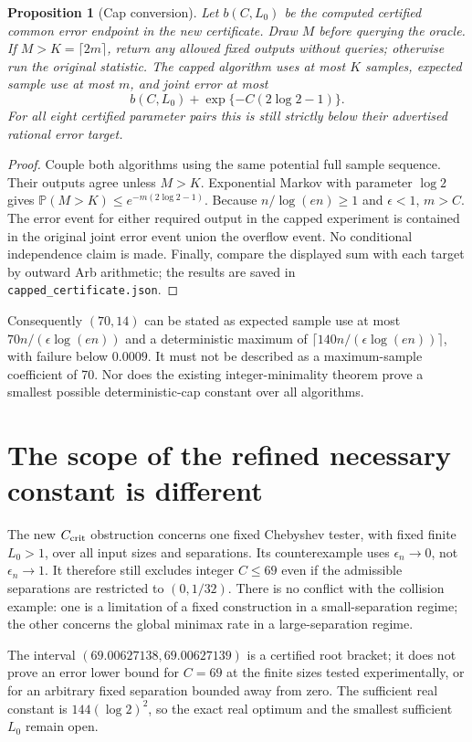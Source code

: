 \documentclass[11pt]{article}
\newtheorem{proposition}{Proposition}
\newcommand{\Prb}{\mathbb P}
\begin{document}
\begin{proposition}[Cap conversion]
Let $b(C,L_0)$ be the computed certified common error endpoint in the new
certificate. Draw $M$ before querying the oracle. If
$M>K=\lceil2m\rceil$, return any allowed fixed outputs without queries;
otherwise run the original statistic. The capped algorithm uses at most
$K$ samples, expected sample use at most $m$, and joint error at most
\[
b(C,L_0)+\exp\{-C(2\log2-1)\}.
\]
For all eight certified parameter pairs this is still strictly below
their advertised rational error target.
\end{proposition}
\begin{proof}
Couple both algorithms using the same potential full sample sequence.
Their outputs agree unless $M>K$. Exponential Markov with parameter
$\log2$ gives $\Prb(M>K)\le e^{-m(2\log2-1)}$.
Because $n/\log(en)\ge1$ and $\epsilon<1$, $m>C$.
The error event for either required output in the capped experiment is
contained in the original joint error event union the overflow event.
No conditional independence claim is made. Finally, compare the displayed
sum with each target by outward Arb arithmetic; the results are saved in
\texttt{capped\_certificate.json}.
\end{proof}

Consequently $(70,14)$ can be stated as expected sample use at most
$70n/(\epsilon\log(en))$ and a deterministic maximum of
$\lceil140n/(\epsilon\log(en))\rceil$, with failure below $0.0009$.
It must not be described as a maximum-sample coefficient of 70.
Nor does the existing integer-minimality theorem prove a smallest possible
deterministic-cap constant over all algorithms.

\section{The scope of the refined necessary constant is different}
The new $C_{\rm crit}$ obstruction concerns one fixed Chebyshev tester,
with fixed finite $L_0>1$, over all input sizes and separations. Its
counterexample uses $\epsilon_n\to0$, not $\epsilon_n\to1$. It therefore
still excludes integer $C\le69$ even if the admissible separations are
restricted to $(0,1/32)$. There is no conflict with the collision example:
one is a limitation of a fixed construction in a small-separation regime;
the other concerns the global minimax rate in a large-separation regime.

The interval $(69.00627138,69.00627139)$ is a certified root bracket;
it does not prove an error lower bound for $C=69$ at the finite sizes
tested experimentally, or for an arbitrary fixed separation bounded away
from zero. The sufficient real constant is $144(\log2)^2$, so the exact
real optimum and the smallest sufficient $L_0$ remain open.
\end{document}
